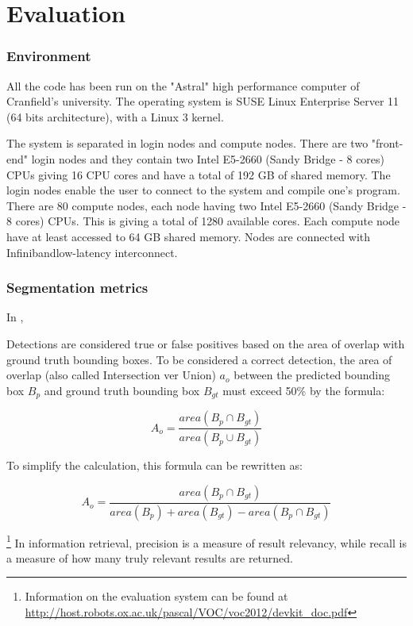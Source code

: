 \chapter{Evaluation}

\subsection{Environment}

All the code has been run on the "Astral" high performance computer of Cranfield's university. The operating system is SUSE Linux Enterprise Server 11 (64 bits architecture), with a Linux 3 kernel.

The system is separated in login nodes and compute nodes. There are two "front-end" login nodes and they contain two Intel E5-2660 (Sandy Bridge - 8 cores) CPUs giving 16 CPU cores and have a total of 192 GB of shared memory. The login nodes enable the user to connect to the system and compile one's program. There are 80 compute nodes, each node having two Intel E5-2660 (Sandy Bridge - 8 cores) CPUs. This is giving a total of 1280 available cores. Each compute node have at least accessed to 64 GB shared memory. Nodes are connected with Infiniband\TM low-latency interconnect.

\subsection{Segmentation metrics}

In \cite{pascalVoc2012},

Detections are considered true or false positives based on the area of overlap with ground truth bounding boxes. To be considered a correct detection, the area of overlap (also called Intersection ver Union) $a_o$ between the predicted bounding box $B_p$ and ground truth bounding box $B_{gt}$ must exceed 50\% by the formula:

$$A_o = \frac{area(B_p \cap B_{gt})}{area(B_p \cup B_{gt})}$$

To simplify the calculation, this formula can be rewritten as:

$$A_o = \frac{area(B_p \cap B_{gt})}{area(B_p) + area(B_{gt}) - area(B_p \cap B_{gt})} $$

\footnote{Information on the evaluation system can be found at  \url{http://host.robots.ox.ac.uk/pascal/VOC/voc2012/devkit_doc.pdf}}
In information retrieval, precision is a measure of result relevancy, while recall is a measure of how many truly relevant results are returned.


